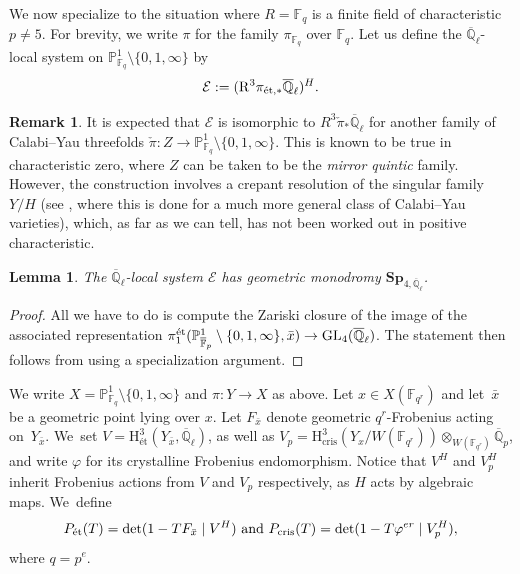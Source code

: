 \documentclass[JEP,XML,SOM,Unicode,published]{cedram}
\numberwithin{equation}{subsection}
\newtheorem{lem}[thm]{Lemma}
\theoremstyle{definition}
\newtheorem{rmk}[thm]{Remark}
\newcommand\Fpbar{{\overline{\mb{F}}_p}}
\newcommand{\Qpbar}{\overline{\mathbb Q}_p}
\newcommand{\Qlbar}{\overline{\mathbb{Q}}_{\ell}}
\newcommand{\Q}{\mathbb Q}
\let\mc\mathcal
\let\mb\mathbb
\begin{document}
We now specialize to the situation where $R=\mathbb{F}_q$ is a finite field of characteristic $p\neq 5$. For brevity, we write $\pi$ for the family $\pi_{\mathbb{F}_q}$ over $\mathbb{F}_q$. Let us define the $\Qlbar$-local system on $\mb{P}^1_{\mb{F}_q}\setminus \{0,1,\infty\}$ by
\begin{equation}\label{eqn: mirrorquintic}
\mathcal{E}:=(\mathrm{R}^3\pi_{\textnormal{ét},\ast}\overline{\Q}_\ell)^H.
\end{equation}

\begin{rmk}
It is expected that $\mc{E}$ is isomorphic to $R^3\check{\pi}_{*}\Qlbar$ for another family of Calabi--Yau threefolds $\check{\pi}: Z \rightarrow \mb{P}^1_{\mb{F}_q}\setminus \{0,1,\infty\}$. This is known to be true in characteristic zero, where $Z$ can be taken to be the \emph{mirror quintic} family. However, the construction involves a crepant resolution of the singular family $Y/H$ (see \cite[Th.\,4.2.2]{Batyrev-Dual-Polyhedra-and-Mirror-Symmetry-for-Calabi-Yau-Hypersurfaces-in-Toric-Varieties}, where this is done for a much more general class of Calabi--Yau varieties), which, as far as we can tell, has not been worked out in positive characteristic.
\end{rmk}

\begin{lem}\label{lma: monodromy-of-Dwork-family}
The $\Qlbar$-local system $\mathcal{E}$ has geometric monodromy $\mathbf{Sp}_{4,\Qlbar}$.
\end{lem}

\begin{proof}
All we have to do is compute the Zariski closure of the image of the associated representation $\pi_1^\textnormal{ét}(\mb{P}^1_{\Fpbar} \setminus \{0,1,\infty\},\bar x)\to\mathrm{GL}_{4}(\overline{\Q}_\ell)$. The statement then follows from \cite[Th.\,8.6]{Katz-Another-Look-at-the-Dwork-Family} using a specialization argument.
\end{proof}

We write $X=\mathbb{P}_{\mathbb{F}_q}^1\setminus\{0,1,\infty\}$ and $\pi\colon Y\to X$ as above. Let $x\in X(\mathbb{F}_{q^r})$ and let~$\bar x$ be a geometric point lying over $x$. Let $F_{\bar x}$ denote geometric $q^r$-Frobenius acting on~$Y_{\bar x}$. We~set $V=\mathrm{H}^3_\text{ét}(Y_{\bar{x}},\Qlbar)$, as well as $V_p=\mathrm{H}^3_\mathrm{cris}(Y_x/W(\mathbb{F}_{q ^r}))\otimes_{W(\mathbb{F}_{q^r})}\Qpbar$, and write $\varphi$ for its crystalline Frobenius endomorphism. Notice that $V^{H}$ and $V_p^H$ inherit Frobenius actions from $V$ and $V_p$ respectively, as $H$ acts by algebraic maps. We~define
\[
P_{\textnormal{ét}}(T)=\det(1-TF_{\bar x}\mid V^H)\text{~and~} P_{\textnormal{cris}}(T)=\det(1-T\varphi^{er}\mid V_p^H),
\]
where $q=p^e$.
\end{document}
